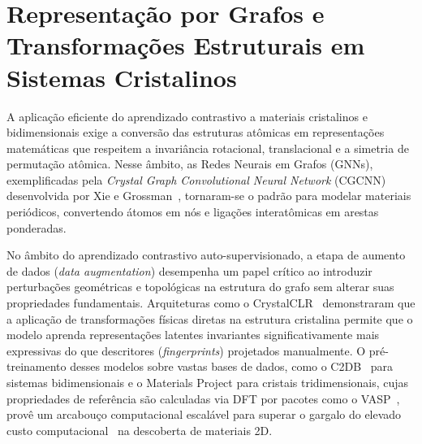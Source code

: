 \section{Representação por Grafos e Transformações Estruturais em Sistemas Cristalinos}

A aplicação eficiente do aprendizado contrastivo a materiais cristalinos e bidimensionais exige a conversão das estruturas atômicas em representações matemáticas que respeitem a invariância rotacional, translacional e a simetria de permutação atômica. Nesse âmbito, as Redes Neurais em Grafos (GNNs), exemplificadas pela \textit{Crystal Graph Convolutional Neural Network} (CGCNN) desenvolvida por Xie e Grossman~\cite{xie2018crystal}, tornaram-se o padrão para modelar materiais periódicos, convertendo átomos em nós e ligações interatômicas em arestas ponderadas.

No âmbito do aprendizado contrastivo auto-supervisionado, a etapa de aumento de dados (\textit{data augmentation}) desempenha um papel crítico ao introduzir perturbações geométricas e topológicas na estrutura do grafo sem alterar suas propriedades fundamentais. Arquiteturas como o CrystalCLR~\cite{koker2022graph} demonstraram que a aplicação de transformações físicas diretas na estrutura cristalina permite que o modelo aprenda representações latentes invariantes significativamente mais expressivas do que descritores (\textit{fingerprints}) projetados manualmente. O pré-treinamento desses modelos sobre vastas bases de dados, como o C2DB~\cite{haastrup2018computational} para sistemas bidimensionais e o Materials Project para cristais tridimensionais, cujas propriedades de referência são calculadas via DFT por pacotes como o VASP~\cite{kresse1996efficient}, provê um arcabouço computacional escalável para superar o gargalo do elevado custo computacional~\cite{langer2022representations} na descoberta de materiais 2D.
